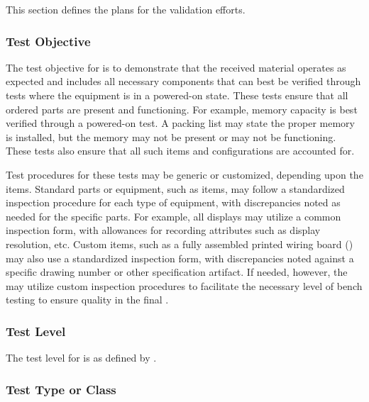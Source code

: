 


This section defines the plans for the \TestIdNameX validation efforts.

\subsubsection{Test Objective}
\label{loc:TestObjective\TestIdName}

The test objective for \TestIdNameX is to demonstrate that the received material operates as expected and includes all necessary components that can best be verified through tests where the equipment is in a powered-on state.
These tests ensure that all ordered parts are present and functioning.
For example, memory capacity is best verified through a powered-on test.
A packing list may state the proper memory is installed, but the memory may not be present or may not be functioning.
These tests also ensure that all such items and configurations are accounted for.

Test procedures for these tests may be generic or customized, depending upon the items.
Standard parts or equipment, such as \COTS items, may follow a standardized inspection procedure for each type of equipment, with discrepancies noted as needed for the specific parts.
For example, all displays may utilize a common inspection form, with allowances for recording attributes such as display resolution, etc.
Custom items, such as a fully assembled printed wiring board (\PWB) may also use a standardized inspection form, with discrepancies noted against a specific drawing number or other specification artifact.
If needed, however, the \TestIdNameX may utilize custom inspection procedures to facilitate the necessary level of bench testing to ensure quality in the final \ThisSys.

\subsubsection{Test Level}
\label{loc:TestLevels\TestIdName}

The test level for \TestIdNameX is \StageTwo as defined by \citeStageTestingSTD.

\subsubsection{Test Type or Class}
\label{loc:TestType\TestIdName}

